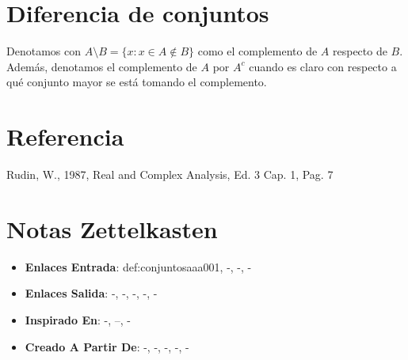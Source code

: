 \documentclass[12pt]{article}
\begin{document}
\section*{Diferencia de conjuntos}

\begin{definition}
Denotamos con $A \setminus B = \{x : x \in A \notin B \}$ como el complemento de $A$ respecto de $B$. Además, denotamos el complemento de $A$ por $A^{c}$ cuando es claro con respecto a qué conjunto mayor se está tomando el complemento. 
\end{definition}

\section*{Referencia}
Rudin, W., 1987, Real and Complex Analysis, Ed. 3 Cap. 1, Pag. 7 

\section*{Notas Zettelkasten}
\begin{itemize}
  \item \textbf{Enlaces Entrada}: def:conjuntosaaa001, -, -, -
  \item \textbf{Enlaces Salida}: -, -, -, -, -
  \item \textbf{Inspirado En}: -, --, -
  \item \textbf{Creado A Partir De}: -, -, -, -, -
\end{itemize}
\end{document}
